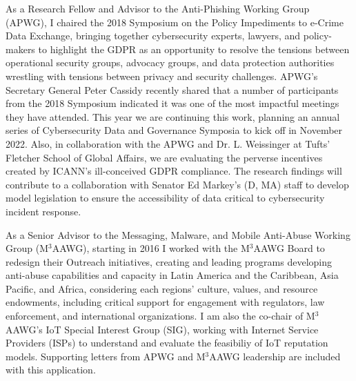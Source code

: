 \documentclass[11pt]{letter}
\begin{document}
\begin{letter}
%
%
As a Research Fellow and Advisor to the Anti-Phishing Working Group (APWG), I chaired the 2018 Symposium on the Policy Impediments to e-Crime Data Exchange, bringing together cybersecurity experts,
lawyers, and policy-makers to highlight the GDPR as an opportunity to resolve the tensions between operational security groups, advocacy groups, and data protection authorities wrestling with tensions between privacy and security challenges.
%
APWG's Secretary General Peter Cassidy recently shared that a number of participants from the 2018 Symposium indicated it was one of the most impactful meetings they have attended.
%
This year we are continuing this work, planning an annual series of Cybersecurity Data and Governance Symposia to kick off in November 2022.
%
Also, in collaboration with the APWG and Dr. L. Weissinger at Tufts' Fletcher School of Global Affairs, we are evaluating the perverse incentives created by ICANN's ill-conceived GDPR compliance.
%
The research findings will contribute to a collaboration with Senator Ed Markey's (D, MA) staff to develop model legislation to ensure the accessibility of data critical to cybersecurity incident response. 

%
As a Senior Advisor to the Messaging, Malware, and Mobile Anti-Abuse Working Group (M$^3$AAWG), starting in 2016 I worked with the M$^3$AAWG Board to redesign their Outreach initiatives, creating and leading 
programs developing anti-abuse capabilities and capacity in Latin America and the Caribbean, Asia Pacific, and Africa, considering each regions' culture, values, and resource endowments, including critical support for engagement with regulators, law enforcement, and international organizations.
%
I am also the co-chair of M$^3$AAWG's IoT Special Interest Group (SIG), working with Internet Service Providers (ISPs) to understand and evaluate the feasibiliy of IoT reputation models.
%
Supporting letters from APWG and M$^3$AAWG leadership are included with this application.



\end{letter}
\end{document}
